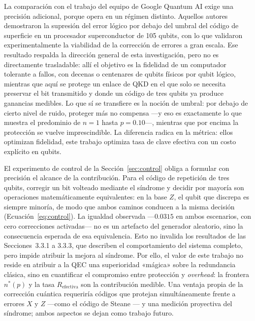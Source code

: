 \documentclass[12pt]{report}
\begin{document}
La comparación con el trabajo del equipo de Google Quantum AI
\citep{google2025} exige una precisión adicional, porque opera en un régimen
distinto. Aquellos autores demostraron la supresión del error lógico por debajo
del umbral del código de superficie en un procesador superconductor de 105
qubits, con lo que validaron experimentalmente la viabilidad de la corrección de
errores a gran escala. Ese resultado respalda la dirección general de esta
investigación, pero no es directamente trasladable: allí el objetivo es la
fidelidad de un computador tolerante a fallos, con decenas o centenares de qubits
físicos por qubit lógico, mientras que aquí se protege un enlace de QKD en el que
solo se necesita preservar el bit transmitido y donde un código de tres qubits ya
produce ganancias medibles. Lo que sí se transfiere es la noción de umbral: por
debajo de cierto nivel de ruido, proteger más no compensa —y eso es exactamente
lo que muestra el predominio de \(n=1\) hasta \(p=0.10\)—, mientras que por encima
la protección se vuelve imprescindible. La diferencia radica en la métrica: ellos
optimizan fidelidad, este trabajo optimiza tasa de clave efectiva con un costo
explícito en qubits.

El experimento de control de la Sección~\ref{sec:control} obliga a formular con
precisión el alcance de la contribución. Para el código de repetición de tres
qubits, corregir un bit volteado mediante el síndrome y decidir por mayoría son
operaciones matemáticamente equivalentes: en la base \(Z\), el qubit que discrepa
es siempre minoría, de modo que ambos caminos conducen a la misma decisión
(Ecuación~\eqref{eq:control}). La igualdad observada —\(0.0315\) en ambos
escenarios, con cero correcciones activadas— no es un artefacto del generador
aleatorio, sino la consecuencia esperada de esa equivalencia. Esto no invalida
los resultados de las Secciones~3.3.1 a 3.3.3, que describen el comportamiento
del sistema completo, pero impide atribuir la mejora al síndrome. Por ello, el
valor de este trabajo no reside en atribuir a la QEC una superioridad «mágica»
sobre la redundancia clásica, sino en cuantificar el compromiso entre protección
y \textit{overhead}: la frontera \(n^{*}(p)\) y la tasa \(R_{\text{efectiva}}\)
son la contribución medible. Una ventaja propia de la corrección cuántica
requeriría códigos que protejan simultáneamente frente a errores \(X\) y \(Z\)
—como el código de Steane \citep{steane1996}— y una medición proyectiva del
síndrome; ambos aspectos se dejan como trabajo futuro.
\end{document}

